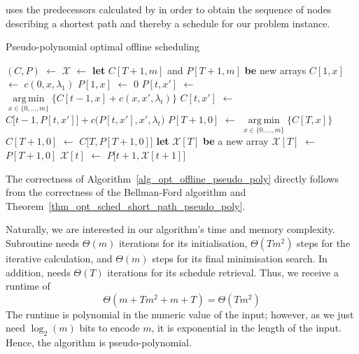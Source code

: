 \documentclass[hidelinks]{article}
\newcommand\Let[2]{\State #1 $\gets$ #2}
\newcommand\Blet[2]{\State \textbf{let} #1 \textbf{be} #2}
\theoremstyle{plain}
\theoremstyle{definition}
\theoremstyle{rem}
\DeclareMathOperator*{\argmin}{arg\,min}
\newcommand{\mx}{\mathcal{X}}
\newcommand{\costs}{c}
\newcommand{\fromto}[2]{\{#1,\ldots,#2\}}
\begin{document}
 uses the predecessors calculated by  in order to obtain the sequence of nodes describing a shortest path and thereby a schedule for our problem instance.
\begin{algorithm}[H]
  \caption{Pseudo-polynomial optimal offline scheduling}
  \begin{algorithmic}[1]
	  \Let{$(C,P)$}{}
	  \Let{$\mx$}{\Call{extract\_schedule}{$P,T$}}
	  \State \Return{$\mx$}
  \EndFunction
  \Statex
	\Blet{$C[T+1,m]$ and $P[T+1,m]$}{new arrays}
		\Let{$C[1,x]$}{$\costs(0,x,\lambda_1)$}
		\Let{$P[1,x]$}{$0$}
	\EndFor
			\Let{$P[t,x']$}{$\argmin\limits_{x\in\fromto{0}{m}}\bigl\{C[t-1,x]+\costs(x,x',\lambda_t)\bigr\}$}
			\Let{$C[t,x']$}{$C\bigl[t-1,P[t,x']\bigr]+c\bigl(P[t,x'],x',\lambda_t\bigr)$}
		\EndFor
	\EndFor
	\Let{$P[T+1,0]$}{$\argmin\limits_{x\in\fromto{0}{m}}\bigl\{C[T,x]\bigr\}$}
	\Let{$C[T+1,0]$}{$C\bigl[T,P[T+1,0]\bigr]$}
	\State {}
  \EndFunction
  \Statex
	\Blet{$\mx[T]$}{a new array}
    	\Let{$\mx[T]$}{$P[T+1,0]$}
		\Let{$\mx[t]$}{$P\bigl[t+1,\mx[t+1]\bigr]$}
	\EndFor
	\State \Return{$\mx$}
  \EndFunction

  \end{algorithmic}
\label{alg_opt_offline_pseudo_poly}
\end{algorithm}
The correctness of Algorithm~\ref{alg_opt_offline_pseudo_poly} directly follows from the correctness of the Bellman-Ford algorithm and Theorem~\ref{thm_opt_sched_short_path_pseudo_poly}.

Naturally, we are interested in our algorithm's time and memory complexity. Subroutine
 needs $\Theta(m)$ iterations for its initialisation, $\Theta(Tm^2)$ steps for the iterative calculation, and $\Theta(m)$ steps for its final minimisation search. In addition,  needs $\Theta(T)$ iterations for its schedule retrieval. Thus, we receive a runtime of 
\begin{equation*}
	\Theta(m+Tm^2+m+T)=\Theta(Tm^2)
\end{equation*}
The runtime is polynomial in the numeric value of the input; however, as we just need $\log_2(m)$ bits to encode $m$, it is exponential in the length of the input. Hence, the algorithm is pseudo-polynomial.
\end{document}
